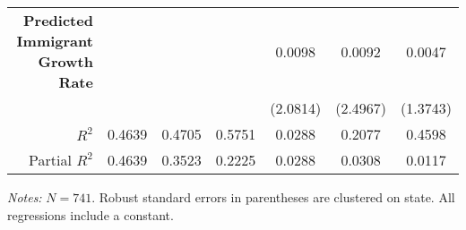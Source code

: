 \begin{frame}
\begin{table}[ht]
{\begin{tabular}{rcccccc}
                \bf{Predicted Immigrant Growth Rate}                          &                 &                 &                 & 0.0098         & 0.0092          & 0.0047          \\
                                                                              &                 &                 &                 & \small(2.0814) & \small(2.4967)  & \small(1.3743)  \\
                \cmidrule(lr){1-1} \cmidrule(lr){2-4} \cmidrule(lr){5-7} 
                $R^2$                                                         & 0.4639          & 0.4705          & 0.5751          & 0.0288         & 0.2077          & 0.4598    \\
                Partial $R^2$                                                 & 0.4639          & 0.3523          & 0.2225          & 0.0288         & 0.0308          & 0.0117    \\
                \bottomrule
            \end{tabular}
        }
        \vspace{0.2cm}
        
        \begin{minipage}{\linewidth}
            \tiny
            \textit{Notes:} $N = 741$. Robust standard errors in parentheses are clustered on state. All regressions include a constant.
        \end{minipage}
    \end{table}
    
    

\end{frame}

